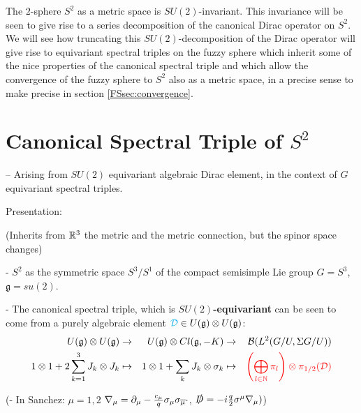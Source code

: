 The $2$-sphere $S^2$ as a metric space is $SU(2)$-invariant. This invariance will be seen to give rise to a series decomposition of the canonical Dirac operator on $S^2$. We will see how truncating this $SU(2)$-decomposition of the Dirac operator will give rise to equivariant spectral triples on the fuzzy sphere which inherit some of the nice properties of the canonical spectral triple and which allow the convergence of the fuzzy sphere to $S^2$ also as a metric space, in a precise sense to make precise in section \ref{FSsec:convergence}.


\section{Canonical Spectral Triple of $S^2$}

-- Arising from $SU(2)$ equivariant algebraic Dirac element, in the context of $G$ equivariant spectral triples.

\linea 

Presentation:

(Inherits from $\mathbb{R}^3$ the metric and the metric connection, but the spinor space changes)

- $S^2$ as the symmetric space $S^3/S^1$ of the compact semisimple Lie group $G = S^3$, $\mathfrak g = su(2)$.
    
- The canonical spectral triple, which is \textbf{$SU(2)$-equivariant} can be seen to come from a purely algebraic element $\textcolor{cyan}{\mathcal D} \in U(\mathfrak g) \otimes U(\mathfrak g)$:
    \begin{align*}
        U(\mathfrak g) \otimes U(\mathfrak g) &\to& U(\mathfrak g) \otimes Cl(\mathfrak g, -K) &\to& \mathcal B(L^2(G/U, \Sigma G/U)) \\
        1 \otimes 1 + 2 \sum_{k = 1}^3 J_k \otimes J_k &\mapsto& 1 \otimes 1 + \sum_k J_k \otimes \sigma_k &\mapsto& \textcolor{red}{\left( \bigoplus_{l\in \mathbb{N}} \pi_l \right) \otimes \pi_{1/2}(\mathcal D)}
    \end{align*}
    
(- In Sanchez: $\mu = 1, 2$
 $\nabla_\mu = \partial_\mu - \frac{c_\mu}{q} \sigma_\mu \sigma_{\overline{\mu}} \cdot$, 
 $\slashed D = -i \frac{q}{2} \sigma^\mu \nabla_\mu)$)

